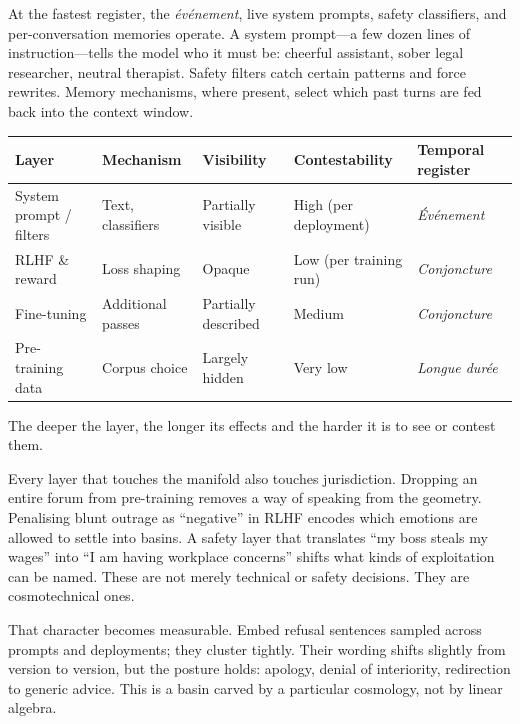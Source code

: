 \documentclass[12pt,a4paper]{article}
\begin{document}
At the fastest register, the \emph{\'ev\'enement}, live system prompts, safety classifiers, and per-conversation memories operate. A system prompt---a few dozen lines of instruction---tells the model who it must be: cheerful assistant, sober legal researcher, neutral therapist. Safety filters catch certain patterns and force rewrites. Memory mechanisms, where present, select which past turns are fed back into the context window.

\begin{formalbox}[title={Layers of cosmotechnical control}]
\begin{center}
\begin{tabular}{@{}lllll@{}}
\toprule
\textbf{Layer} & \textbf{Mechanism} & \textbf{Visibility} & \textbf{Contestability} & \textbf{Temporal register} \\
\midrule
System prompt / filters & Text, classifiers & Partially visible & High (per deployment) & \emph{\'Ev\'enement} \\
RLHF \& reward & Loss shaping & Opaque & Low (per training run) & \emph{Conjoncture} \\
Fine-tuning & Additional passes & Partially described & Medium & \emph{Conjoncture} \\
Pre-training data & Corpus choice & Largely hidden & Very low & \emph{Longue dur\'ee} \\
\bottomrule
\end{tabular}
\end{center}
\medskip
The deeper the layer, the longer its effects and the harder it is to see or contest them.
\end{formalbox}

Every layer that touches the manifold also touches jurisdiction. Dropping an entire forum from pre-training removes a way of speaking from the geometry. Penalising blunt outrage as ``negative'' in RLHF encodes which emotions are allowed to settle into basins. A safety layer that translates ``my boss steals my wages'' into ``I am having workplace concerns'' shifts what kinds of exploitation can be named. These are not merely technical or safety decisions. They are cosmotechnical ones.

That character becomes measurable. Embed refusal sentences sampled across prompts and deployments; they cluster tightly. Their wording shifts slightly from version to version, but the posture holds: apology, denial of interiority, redirection to generic advice. This is a basin carved by a particular cosmology, not by linear algebra.
\end{document}
